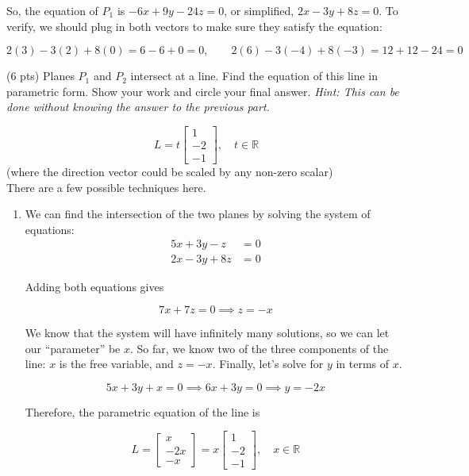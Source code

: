 \documentclass[11pt]{article}
\begin{document}
\begin{prob}[(12 pts)]
\begin{subprob}
\begin{solution}
So, the equation of $P_1$ is $-6x + 9y - 24z = 0$, or simplified, $\boxed{2x - 3y + 8z = 0}$. To verify, we should plug in both vectors to make sure they satisfy the equation:

$$2(3) - 3(2) + 8(0) = 6 - 6 + 0 = 0, \qquad 2(6) - 3(-4) + 8(-3) = 12 + 12 - 24 = 0$$

\end{solution}
\end{subprob}

\begin{subprob}(6 pts)
Planes $P_1$ and $P_2$ intersect at a line. Find the equation of this line in parametric form. Show your work and $\boxed{\text{circle}}$ your final answer. \textit{Hint: This can be done without knowing the answer to the previous part.} \\

\emptybox{8.5cm}

\begin{solution}
$$L = t \begin{bmatrix} 1 \\ -2 \\ -1 \end{bmatrix}, \quad t \in \mathbb{R}$$ (where the direction vector could be scaled by any non-zero scalar) \\

There are a few possible techniques here.

\begin{enumerate}
    \item We can find the intersection of the two planes by solving the system of equations:
    \begin{align*}
        5x + 3y - z   &= 0 \\
        2x - 3y + 8z &= 0
    \end{align*}

    Adding both equations gives

    $$7x + 7z = 0 \implies z = -x$$

    We know that the system will have infinitely many solutions, so we can let our ``parameter'' be $x$. So far, we know two of the three components of the line: $x$ is the free variable, and $z = -x$. Finally, let's solve for $y$ in terms of $x$.

    $$5x + 3y + x = 0 \implies 6x + 3y = 0 \implies y = - 2x$$

    Therefore, the parametric equation of the line is

    $$L = \begin{bmatrix} x \\ -2x \\ -x \end{bmatrix} = x \begin{bmatrix} 1 \\ -2 \\ -1 \end{bmatrix}, \quad x \in \mathbb{R}$$


\end{enumerate}
\end{solution}
\end{subprob}
\end{prob}
\end{document}
